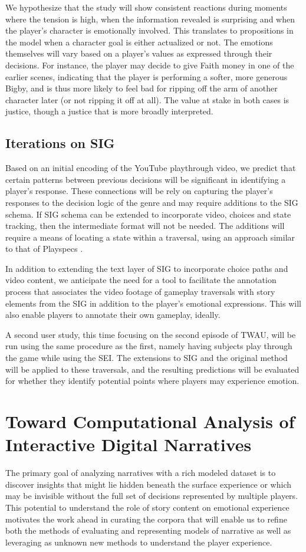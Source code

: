 We hypothesize that the study will show consistent reactions during
moments where the tension is high, when the information revealed is
surprising and when the player's character is emotionally
involved. This translates to propositions in the model when a
character goal is either actualized or not. The emotions themselves
will vary based on a player's values as expressed through their
decisions. For instance, the player may decide to give Faith money in
one of the earlier scenes, indicating that the player is performing a
softer, more generous Bigby, and is thus more likely to feel bad for
ripping off the arm of another character later (or not ripping it off
at all). The value at stake in both cases is justice, though a justice
that is more broadly interpreted.

\subsection{Iterations on SIG}
\label{sec:orgheadline7}
Based on an initial encoding of the YouTube playthrough video, we
predict that certain patterns between previous decisions will be
significant in identifying a player's response. These connections will
be rely on capturing the player's responses to the decision logic of
the genre and may require additions to the SIG schema. If SIG schema
can be extended to incorporate video, choices and state tracking, then
the intermediate format will not be needed. The additions will require
a means of locating a state within a traversal, using an approach
similar to that of Playspecs \cite{Osborn2015-gr}.

In addition to extending the text layer of SIG to incorporate choice
paths and video content, we anticipate the need for a tool to
facilitate the annotation process that associates the video footage of
gameplay traversals with story elements from the SIG in addition to
the player's emotional expressions. This will also enable players to
annotate their own gameplay, ideally.

A second user study, this time focusing on the second episode of TWAU,
will be run using the same procedure as the first, namely having
subjects play through the game while using the SEI. The extensions to
SIG and the original method will be applied to these traversals, and
the resulting predictions will be evaluated for whether they identify
potential points where players may experience emotion.

\section{Toward Computational Analysis of Interactive Digital Narratives}
\label{sec:orgheadline9}
The primary goal of analyzing narratives with a rich modeled dataset
is to discover insights that might lie hidden beneath the surface
experience or which may be invisible without the full set of decisions
represented by multiple players.  This potential to understand the
role of story content on emotional experience motivates the work ahead
in curating the corpora that will enable us to refine both the methods
of evaluating and representing models of narrative as well as
leveraging as unknown new methods to understand the player experience.

